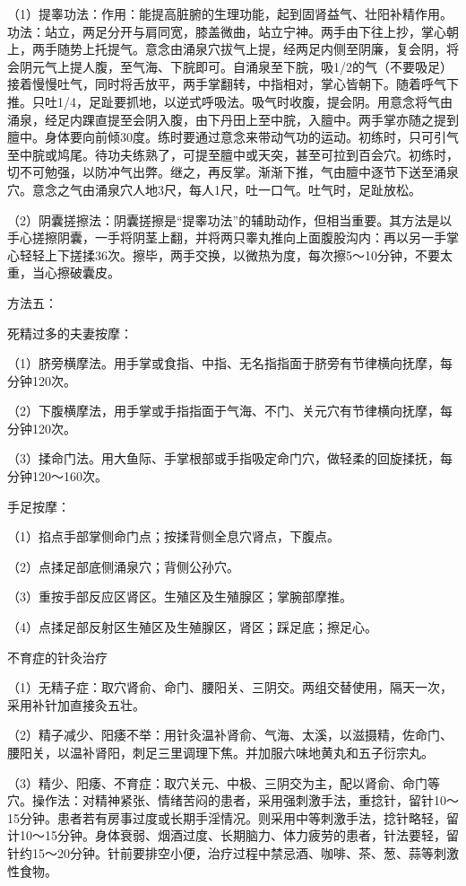 \documentclass[12pt,UTF8]{ctexbook}
\begin{document}
（1）提睾功法：作用：能提高脏腑的生理功能，起到固肾益气、壮阳补精作用。功法：站立，两足分开与肩同宽，膝盖微曲，站立宁神。两手由下往上抄，掌心朝上，两手随势上托提气。意念由涌泉穴拔气上提，经两足内侧至阴廉，复会阴，将会阴元气上提人腹，至气海、下脘即可。自涌泉至下脘，吸1/2的气（不要吸足）接着慢慢吐气，同时将舌放平，两手掌翻转，中指相对，掌心皆朝下。随着呼气下推。只吐1/4，足趾要抓地，以逆式呼吸法。吸气时收腹，提会阴。用意念将气由涌泉，经足内踝直提至会阴入腹，由下丹田上至中脘，入膻中。两手掌亦随之提到膻中。身体要向前倾30度。练时要通过意念来带动气功的运动。初练时，只可引气至中脘或鸠尾。待功夫练熟了，可提至膻中或天突，甚至可拉到百会穴。初练时，切不可勉强，以防冲气出弊。继之，再反掌。渐渐下推，气由膻中逐节下送至涌泉穴。意念之气由涌泉穴人地3尺，每人1尺，吐一口气。吐气时，足趾放松。

（2）阴囊搓擦法：阴囊搓擦是“提睾功法”的辅助动作，但相当重要。其方法是以手心搓擦阴囊，一手将阴茎上翻，并将两只睾丸推向上面腹股沟内：再以另一手掌心轻轻上下搓揉36次。擦毕，两手交换，以微热为度，每次擦5～10分钟，不要太重，当心擦破囊皮。

方法五：

死精过多的夫妻按摩：

（1）脐旁横摩法。用手掌或食指、中指、无名指指面于脐旁有节律横向抚摩，每分钟120次。

（2）下腹横摩法，用手掌或手指指面于气海、不门、关元穴有节律横向抚摩，每分钟120次。

（3）揉命门法。用大鱼际、手掌根部或手指吸定命门穴，做轻柔的回旋揉抚，每分钟120～160次。

手足按摩：

（1）掐点手部掌侧命门点；按揉背侧全息穴肾点，下腹点。

（2）点揉足部底侧涌泉穴；背侧公孙穴。

（3）重按手部反应区肾区。生殖区及生殖腺区；掌腕部摩推。

（4）点揉足部反射区生殖区及生殖腺区，肾区；踩足底；擦足心。





不育症的针灸治疗


（1）无精子症：取穴肾俞、命门、腰阳关、三阴交。两组交替使用，隔天一次，采用补针加直接灸五壮。

（2）精子减少、阳痿不举：用针灸温补肾俞、气海、太溪，以滋摄精，佐命门、腰阳关，以温补肾阳，刺足三里调理下焦。并加服六味地黄丸和五子衍宗丸。

（3）精少、阳痿、不育症：取穴关元、中极、三阴交为主，配以肾俞、命门等穴。操作法：对精神紧张、情绪苦闷的患者，采用强刺激手法，重捻针，留针10～15分钟。患者若有房事过度或长期手淫情况。则采用中等刺激手法，捻针略轻，留计10～15分钟。身体衰弱、烟酒过度、长期脑力、体力疲劳的患者，针法要轻，留针约15～20分钟。针前要排空小便，治疗过程中禁忌酒、咖啡、茶、葱、蒜等刺激性食物。
\end{document}
